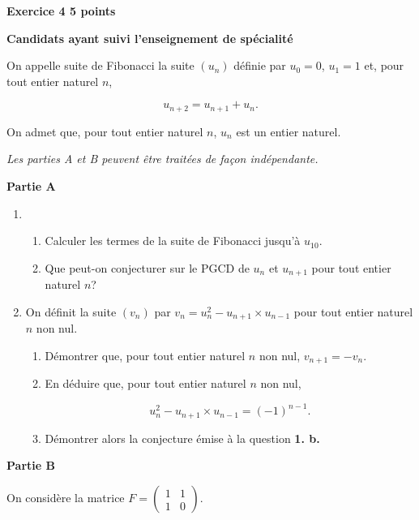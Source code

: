 \documentclass[10pt,a4paper]{article}
\begin{document}
\textbf{Exercice 4 \hfill 5 points}

\medskip

\textbf{Candidats ayant suivi l'enseignement de spécialité}

\bigskip

On appelle suite de Fibonacci la suite $(u_n)$ définie par $u_0=0$, $u_1=1$ et, pour tout entier naturel $n$,

\[u_{n+2} = u_{n+1} + u_{n}.\]

On admet que, pour tout entier naturel $n$, $u_n$ est un entier naturel.

\smallskip

\emph{Les parties \emph{A} et \emph{B} peuvent être traitées de façon indépendante.}

\bigskip

\textbf{Partie A}

\medskip

\begin{enumerate}
\item 
\begin{enumerate}
\item Calculer les termes de la suite de Fibonacci jusqu'à $u_{10}$.
\item Que peut-on conjecturer sur le PGCD de $u_{n}$ et $u_{n+1}$ pour tout entier naturel $n$?
\end{enumerate}

\item On définit la suite $(v_n)$ par $v_n=u_n^2 - u_{n+1}\times u_{n-1}$ pour tout entier naturel $n$ non nul.
\begin{enumerate}
\item Démontrer que, pour tout entier naturel $n$ non nul, $v_{n+1} = -v_n$.
\item En déduire que, pour tout entier naturel $n$ non nul,

\[u_n^2 - u_{n+1}\times u_{n-1} = \left (-1\right )^{n-1}.\]
\item Démontrer alors la conjecture émise à la question \textbf{1. b.}
\end{enumerate}
\end{enumerate}

\bigskip

\textbf{Partie B}

\medskip

On considère la matrice
$F=\begin{pmatrix} 1 & 1 \\ 1 & 0\end{pmatrix}$.
\end{document}
